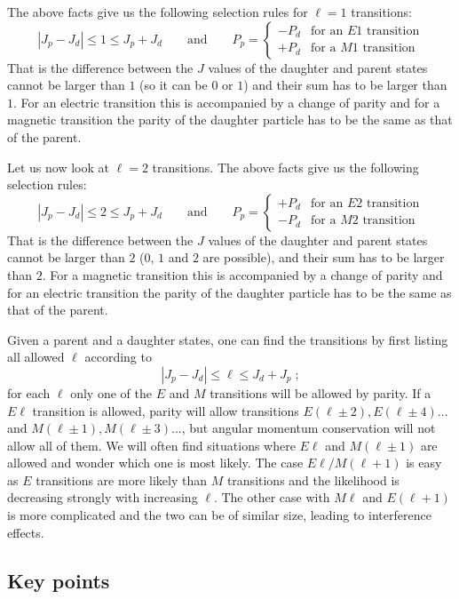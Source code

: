 \documentclass[12pt]{article}
\begin{document}
The above facts give us the following selection rules for $\ell=1$ transitions:
\[|J_p-J_d|\leq 1\leq J_p+J_d \qquad\mbox{and}\qquad P_p=\left\{\begin{array}{cc}
-P_d&\mbox{for an $E1$ transition}\\
+P_d&\mbox{for a $M1$ transition}\end{array}\right.\]
That is the difference between the $J$ values of the daughter and parent states cannot be larger than $1$ (so it can be $0$ or $1$) and their sum has to be larger than $1$. For an electric transition this is accompanied by a change of parity and for a magnetic transition the parity of the daughter particle has to be the same as that of the parent.

Let us now look at $\ell=2$ transitions. The above facts give us the following selection rules:
\[|J_p-J_d|\leq 2\leq J_p+J_d \qquad\mbox{and}\qquad P_p=\left\{\begin{array}{cc}
+P_d&\mbox{for an $E2$ transition}\\
-P_d&\mbox{for a $M2$ transition}\end{array}\right.\]
That is the difference between the $J$ values of the daughter and parent states cannot be larger than $2$ ($0$, $1$ and $2$ are possible), and their sum has to be larger than $2$. For a magnetic transition this is accompanied by a change of parity and for an electric transition the parity of the daughter particle has to be the same as that of the parent. 

Given a parent and a daughter states, one can find the transitions by first listing all allowed $\ell$ according to
\[|J_p-J_d|\leq \ell\leq J_d+J_p\;; \]
for each $\ell$ only one of the $E$ and $M$ transitions will be allowed by parity. If a $E\ell$ transition is allowed, parity will allow transitions $E(\ell\pm2),E(\ell\pm4)...$ and $M(\ell\pm1),M(\ell\pm3)...$, but angular momentum conservation will not allow all of them. We will often find situations where $E\ell$ and $M(\ell\pm1)$ are allowed and wonder which one is most likely. The case $E\ell/M(\ell+1)$ is easy as $E$ transitions are more likely than $M$ transitions and the likelihood is decreasing strongly with increasing $\ell$. The other case with $M\ell$ and $E(\ell+1)$ is more complicated and the two can be of similar size, leading to interference effects.
\subsection{Key points}\begin{itemize}
  
\end{itemize}
\end{document}

